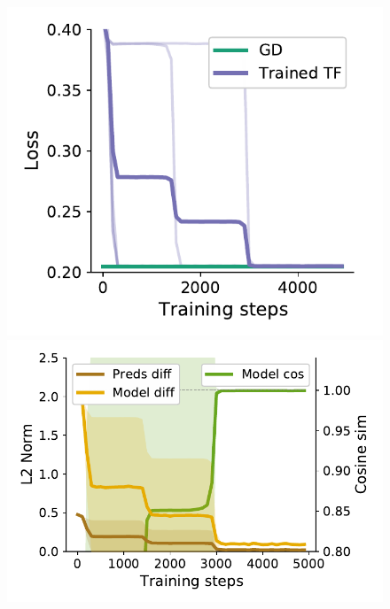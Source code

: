 \documentclass{article}
\theoremstyle{plain}
\theoremstyle{definition}
\theoremstyle{remark}
\begin{document}
\begin{figure}
\vspace{-7pt}
\centering
\begin{minipage}{.23\textwidth}
  \centering
  \begin{center}
    \includegraphics[width=1.\textwidth]{Final_figures/linear/linear_one_layer_one_head_0_002/train.pdf}
  \end{center}
  \vspace{-10pt}
\end{minipage}
\begin{minipage}{.28\textwidth}
  \centering
  \begin{center}
    \includegraphics[width=1.\textwidth]{Final_figures/linear/linear_one_layer_one_head_0_002/sim.pdf}

\end{center}
\end{minipage}
\end{figure}
\end{document}
